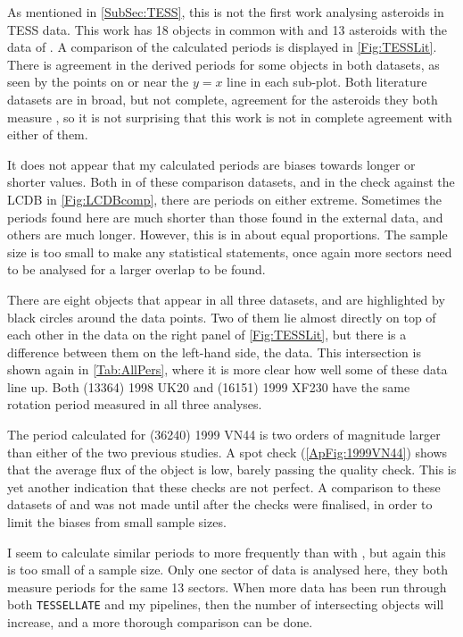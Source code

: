 \documentclass{UCreport}
\begin{document}
As mentioned in \autoref{SubSec:TESS}, this is not the first work analysing asteroids in TESS data.
This work has 18 objects in common with \citet{McNeill2023} and 13 asteroids with the data of \citet{Pal2020}.
A comparison of the calculated periods is displayed in \autoref{Fig:TESSLit}.
There is agreement in the derived periods for some objects in both datasets, as seen by the points on or near the $y=x$ line in each sub-plot.
Both literature datasets are in broad, but not complete, agreement for the asteroids they both measure \citep[see the comparison in][]{McNeill2023}, so it is not surprising that this work is not in complete agreement with either of them.

It does not appear that my calculated periods are biases towards longer or shorter values.
Both in of these comparison datasets, and in the check against the LCDB in \autoref{Fig:LCDBcomp}, there are periods on either extreme.
Sometimes the periods found here are much shorter than those found in the external data, and others are much longer.
However, this is in about equal proportions.
The sample size is too small to make any statistical statements, once again more sectors need to be analysed for a larger overlap to be found.

There are eight objects that appear in all three datasets, and are highlighted by black circles around the data points.
Two of them lie almost directly on top of each other in the \citeauthor{Pal2020} data on the right panel of \autoref{Fig:TESSLit}, but there is a difference between them on the left-hand side, the \citeauthor{McNeill2023} data.
This intersection is shown again in \autoref{Tab:AllPers}, where it is more clear how well some of these data line up.
Both (13364) 1998 UK20 and (16151) 1999 XF230 have the same rotation period measured in all three analyses.

The period calculated for (36240) 1999 VN44 is two orders of magnitude larger than either of the two previous studies.
A spot check (\autoref{ApFig:1999VN44}) shows that the average flux of the object is low, barely passing the quality check.
This is yet another indication that these checks are not perfect.
A comparison to these datasets of \citeauthor{Pal2020} and \citeauthor{McNeill2023} was not made until after the checks were finalised, in order to limit the biases from small sample sizes. 

I seem to calculate similar periods to \citeauthor{Pal2020} more frequently than with \citeauthor{McNeill2023}, but again this is too small of a sample size.
Only one sector of data is analysed here, they both measure periods for the same 13 sectors. 
When more data has been run through both \texttt{TESSELLATE} and my pipelines, then the number of intersecting objects will increase, and a more thorough comparison can be done.
\end{document}
